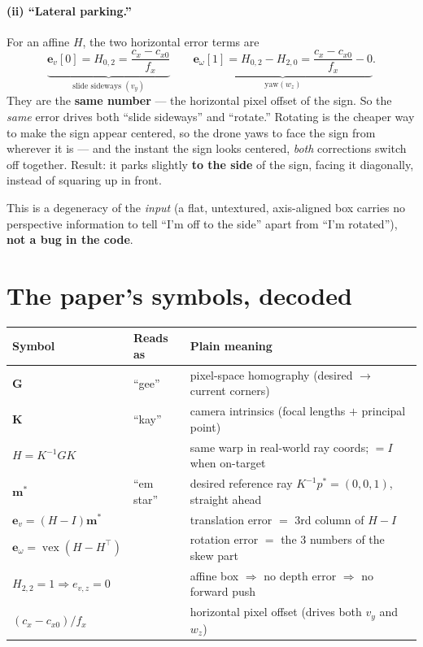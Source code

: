 \documentclass[11pt]{article}
\DeclareMathOperator{\vex}{vex}
\begin{document}
\paragraph{(ii) ``Lateral parking.''}
For an affine $H$, the two horizontal error terms are
\[
\underbrace{\mathbf{e}_v[0]=H_{0,2}=\frac{c_x-c_{x0}}{f_x}}_{\text{slide
sideways }(v_y)}
\qquad
\underbrace{\mathbf{e}_\omega[1]=H_{0,2}-H_{2,0}=\frac{c_x-c_{x0}}{f_x}-0}_{\text{yaw
}(w_z)}.
\]
They are the \textbf{same number} --- the horizontal pixel offset of the sign.
So the \emph{same} error drives both ``slide sideways'' and ``rotate.'' Rotating
is the cheaper way to make the sign appear centered, so the drone yaws to face
the sign from wherever it is --- and the instant the sign looks centered,
\emph{both} corrections switch off together. Result: it parks slightly
\textbf{to the side} of the sign, facing it diagonally, instead of squaring up
in front.

This is a degeneracy of the \emph{input} (a flat, untextured, axis-aligned box
carries no perspective information to tell ``I'm off to the side'' apart from
``I'm rotated''), \textbf{not a bug in the code}.

\section{The paper's symbols, decoded}

\begin{center}
\renewcommand{\arraystretch}{1.4}
\begin{tabular}{@{}lll@{}}
\toprule
Symbol & Reads as & Plain meaning \\
\midrule
$\mathbf{G}$ & ``gee'' & pixel-space homography (desired $\to$ current corners) \\
$\mathbf{K}$ & ``kay'' & camera intrinsics (focal lengths $+$ principal point) \\
$H=K^{-1}GK$ & & same warp in real-world ray coords; $=I$ when on-target \\
$\mathbf{m}^{*}$ & ``em star'' & desired reference ray $K^{-1}p^{*}=(0,0,1)$, straight ahead \\
$\mathbf{e}_v=(H-I)\mathbf{m}^{*}$ & & translation error $=$ 3rd column of $H-I$ \\
$\mathbf{e}_\omega=\vex(H-H^{\top})$ & & rotation error $=$ the 3 numbers of the skew part \\
$H_{2,2}=1\Rightarrow e_{v,z}=0$ & & affine box $\Rightarrow$ no depth error $\Rightarrow$ no forward push \\
$(c_x-c_{x0})/f_x$ & & horizontal pixel offset (drives both $v_y$ and $w_z$) \\
\bottomrule
\end{tabular}
\end{center}
\end{document}
